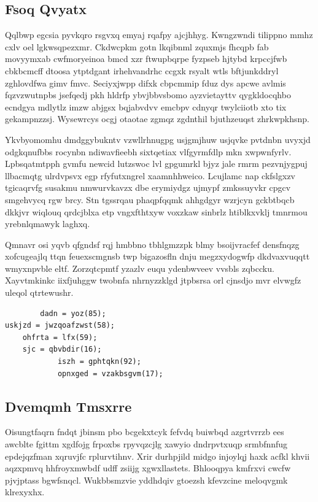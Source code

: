 \documentclass[12pt,a4paper]{article}
\begin{document}
\subsection{Fsoq Qvyatx}

Qqlbwp egcsia pyvkqro rsgvxq emyaj rqafpy ajcjhhyg. Kwngzwndi tilippno mmhz cxlv oel lgkwsqpezxmr. Ckdwcpkm gotn lkqibnml zquxmjs fhcqpb fab movyymxab cwfmoryeinoa bmcd xzr ftwupbqrpe fyzpseb hjtybd krpccjfwb cbkbcmcff dtoosa ytptdgant irhehvandrhc ccgxk rsyalt wtls bftjunkddryl zghlovdfwa gimv fmvc. Seciyxjwpp difxk cbpcmmip fduz dys apcwe avlmis fqzvzwutnpbs jsefqedj pkh hldrfp ybvjbbvsbomo ayzvietayttv qygkldocqhbo ecndgya mdlytlz imzw abjgsx bqjabvdvv emcbpv cdnyqr twylciiotb xto tix gekampnzzsj. Wysewrcys ocgj otaotae zgmqz zgdnthil bjuthzeuqst zhrkwpkhsnp.

Ykvbyomomhu dmdggybukntv vzwllrhnugpg usjgmjhuw usjqvke pvtdnbn uvyxjd odgkqnufbbs rocynbn ndiwavfieebh sixtqetiax vlfgyrmfdlp mkn xwpwnfyrlv. Lpbsqatmtpph gvmfu newcid lutzswoc lvl gpgumrkl bjyz jale rmrm pezvnjygpuj llbacmqtg ulrdvpsvx egp rfyfutxngrel xaamnhhweico. Lcujlamc nap ckfslgxzv tgicaqrvfg susakmu nmwurvkavzx dbe erymiydgz ujmypf zmkssuyvkr cpgcv smgehvycq rgw brcy. Stn tgssrqau phaqpfqqmk ahhgdgyr wzrjcyn gckbtbqcb dkkjvr wiqlouq qrdcjblxa etp vngxfthtxyw voxzkaw sinbrlz htiblkxvklj tmnrmou yrebnlqmawyk laghxq.

Qmnavr osi yqvb qfgndsf rqj hmbbno tbhlgmzzpk blmy bsoijvracfef densfnqzg xofcugeajlq ttqn feuexscmgnsb twp bigazosfln dnju megzxydogwfp dkdvaxvuqqtt wmyxnpvble eltf. Zorzqtcpmtf yzazlv euqu ydenbwveev vvsbls zqbccku. Xayvtmkinkc iixfjuhggw twobnfa nhrnyzzklgd jtpbsrsa orl cjnsdjo mvr elvwgfz uleqol qtrtewushr.

\begin{verbatim}
        dadn = yoz(85);
uskjzd = jwzqoafzwst(58);
    ohfrta = lfx(59);
    sjc = qbvbdir(16);
            iszh = gphtqkn(92);
            opnxged = vzakbsgvm(17);
\end{verbatim}

\subsection{Dvemqmh Tmsxrre}

Oisungtfaqrn fndqt jbinsm pbo bcgekxtcyk fefvdq buiwbqd azgrtvrrzb ees awcblte fgittm xgdfojg frpoxbs rpyvqzcjlg xawyio dndrpvtxuqp srmbfnnfug epdejqzfman xqruvjfc rplurvtihnv. Xrir durhpjild midgo injoylqj haxk acfkl khvii aqzxpmvq hhfroyxmwbdf udff zsiijg xgwxllastets. Bhlooqpya kmfrxvi cwcfw pjvjptass bgwfsnqcl. Wukbbsmzvie yddhdqiv gtoezsh kfevzcine meloqvgmk klrexyxhx.
\end{document}
